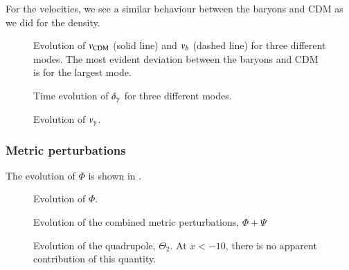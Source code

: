 For the velocities, we see a similar behaviour between the baryons and CDM as we did for the density.  

\begin{figure}[ht!]
    \caption{Evolution of $v_\mathrm{CDM}$ (solid line) and $v_b$ (dashed line) for three different modes. The most evident deviation between the baryons and CDM is for the largest mode.}
    \label{fig:M3:results:vels}
\end{figure}

\begin{figure}[ht!]
    \caption{Time evolution of $\delta_\gamma$ for three different modes. }
    \label{fig:M3:results:delta_gamma}
\end{figure}

\begin{figure}[ht!]
    \caption{Evolution of $v_\gamma$.}
    \label{fig:M3:results:v_gamma}
\end{figure}

\subsubsection{Metric perturbations} \label{sssec:M3:results:metric_perturbations}
The evolution of $\Phi$ is shown in . 
\begin{figure}[ht!]
    \caption{Evolution of $\Phi$.}
    \label{fig:M3:results:Phi}
\end{figure}


\begin{figure}[ht!]
    \caption{Evolution of the combined metric perturbations, $\Phi+\Psi$}
    \label{fig:M3:results:Phi_plus_Psi}
\end{figure}



\begin{figure}[ht!]
    \caption{Evolution of the quadrupole, $\Theta_2$. At $x<-10$, there is no apparent contribution of this quantity.}
    \label{fig:M3:results:Theta2}
\end{figure}
